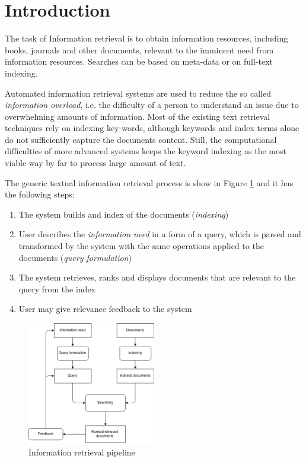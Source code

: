 \section{Introduction}

The task of Information retrieval is to obtain information resources, including books, journals and other documents, relevant to the imminent need from information resources. Searches can be based on meta-data or on full-text indexing.

Automated information retrieval systems are used to reduce the so called \textit{information overload}, i.e. the difficulty of a person to understand an issue due to overwhelming amounts of information. Most of the existing text retrieval techniques rely on indexing key-words, although keywords and index terms alone do not sufficiently capture the documents content. Still, the computational difficulties of more advanced systems keeps the keyword indexing as the most viable way by far to process large amount of text. 

The generic textual information retrieval process is show in Figure \ref{fig:IR} and it has the following steps:
\begin{enumerate}
  \item The system builds and index of the documents (\textit{indexing}) 
  \item User describes the \textit{information need} in a form of a query, which is parsed and transformed by the system with the same operations applied to the documents (\textit{query formulation})
  \item The system retrieves, ranks and displays documents that are relevant to the query from the index
  \item User may give relevance feedback to the system
\end{enumerate}
\begin{figure}[ht]
	\centering
	\includegraphics[width=0.5\textwidth]{IR.png}
	\caption{Information retrieval pipeline \citep{hiemstra2009information}}
	\label{fig:IR}
\end{figure}
\FloatBarrier

